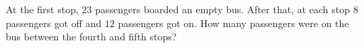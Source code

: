 At the first stop, $23$ passengers boarded an empty bus. After that, at each stop $8$ passengers got off and $12$ passengers got on. How many passengers were on the bus between the fourth and fifth stops?
